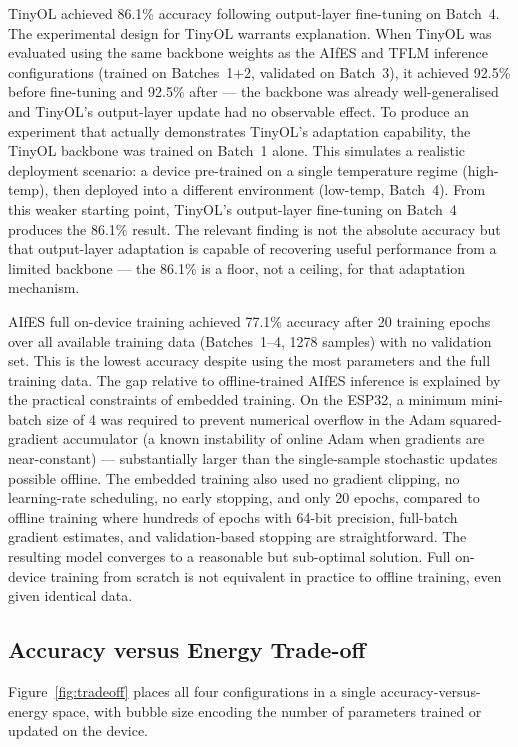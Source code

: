 TinyOL achieved 86.1\% accuracy following output-layer fine-tuning on Batch~4. The experimental design for TinyOL warrants explanation. When TinyOL was evaluated using the same backbone weights as the AIfES and TFLM inference configurations (trained on Batches~1+2, validated on Batch~3), it achieved 92.5\% before fine-tuning and 92.5\% after --- the backbone was already well-generalised and TinyOL's output-layer update had no observable effect. To produce an experiment that actually demonstrates TinyOL's adaptation capability, the TinyOL backbone was trained on Batch~1 alone. This simulates a realistic deployment scenario: a device pre-trained on a single temperature regime (high-temp), then deployed into a different environment (low-temp, Batch~4). From this weaker starting point, TinyOL's output-layer fine-tuning on Batch~4 produces the 86.1\% result. The relevant finding is not the absolute accuracy but that output-layer adaptation is capable of recovering useful performance from a limited backbone --- the 86.1\% is a floor, not a ceiling, for that adaptation mechanism.

AIfES full on-device training achieved 77.1\% accuracy after 20 training epochs over all available training data (Batches~1--4, 1278 samples) with no validation set. This is the lowest accuracy despite using the most parameters and the full training data. The gap relative to offline-trained AIfES inference is explained by the practical constraints of embedded training. On the ESP32, a minimum mini-batch size of 4 was required to prevent numerical overflow in the Adam squared-gradient accumulator (a known instability of online Adam when gradients are near-constant) --- substantially larger than the single-sample stochastic updates possible offline. The embedded training also used no gradient clipping, no learning-rate scheduling, no early stopping, and only 20 epochs, compared to offline training where hundreds of epochs with 64-bit precision, full-batch gradient estimates, and validation-based stopping are straightforward. The resulting model converges to a reasonable but sub-optimal solution. Full on-device training from scratch is not equivalent in practice to offline training, even given identical data.

\subsection{Accuracy versus Energy Trade-off}\label{subsec:res_tradeoff}

Figure~\ref{fig:tradeoff} places all four configurations in a single accuracy-versus-energy space, with bubble size encoding the number of parameters trained or updated on the device.

